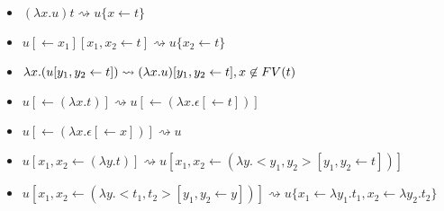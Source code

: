 \documentclass[a4paper]{article}
\begin{document}
\begin{itemize}
 \item $(\lambda x.u)t \rightsquigarrow u\{x\leftarrow t\}$
 \item $u[\leftarrow x_1][x_1,x_2\leftarrow t] \rightsquigarrow u\{x_2\leftarrow t\}$
 \item $\lambda x.(u[y_1,y_2\leftarrow t]) \rightsquigarrow (\lambda x.u)[y_1,y_2\leftarrow t], x\not\in\mathop{FV}(t)$
 \item $u[\leftarrow (\lambda x.t)] \rightsquigarrow u[\leftarrow (\lambda x.\epsilon[\leftarrow t])]$
 \item $u[\leftarrow (\lambda x.\epsilon[\leftarrow x])] \rightsquigarrow u$
 \item $u[x_1,x_2\leftarrow (\lambda y.t)] \rightsquigarrow u[x_1,x_2\leftarrow (\lambda y.<y_1,y_2>[y_1,y_2\leftarrow t])]$
 \item $u[x_1,x_2\leftarrow (\lambda y.<t_1,t_2>[y_1,y_2\leftarrow y])] \rightsquigarrow u\{x_1\leftarrow \lambda y_1.t_1, x_2\leftarrow \lambda y_2.t_2\}$
\end{itemize}
\end{document}
